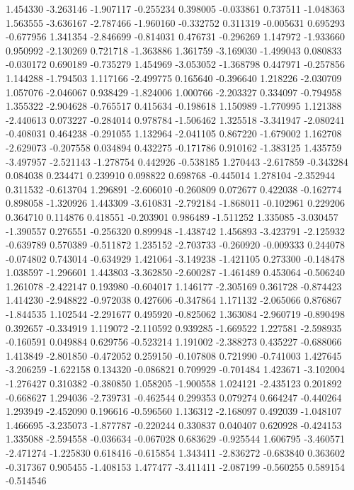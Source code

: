 1.454330
-3.263146
-1.907117
-0.255234
0.398005
-0.033861
0.737511
-1.048363
1.563555
-3.636167
-2.787466
-1.960160
-0.332752
0.311319
-0.005631
0.695293
-0.677956
1.341354
-2.846699
-0.814031
0.476731
-0.296269
1.147972
-1.933660
0.950992
-2.130269
0.721718
-1.363886
1.361759
-3.169030
-1.499043
0.080833
-0.030172
0.690189
-0.735279
1.454969
-3.053052
-1.368798
0.447971
-0.257856
1.144288
-1.794503
1.117166
-2.499775
0.165640
-0.396640
1.218226
-2.030709
1.057076
-2.046067
0.938429
-1.824006
1.000766
-2.203327
0.334097
-0.794958
1.355322
-2.904628
-0.765517
0.415634
-0.198618
1.150989
-1.770995
1.121388
-2.440613
0.073227
-0.284014
0.978784
-1.506462
1.325518
-3.341947
-2.080241
-0.408031
0.464238
-0.291055
1.132964
-2.041105
0.867220
-1.679002
1.162708
-2.629073
-0.207558
0.034894
0.432275
-0.171786
0.910162
-1.383125
1.435759
-3.497957
-2.521143
-1.278754
0.442926
-0.538185
1.270443
-2.617859
-0.343284
0.084038
0.234471
0.239910
0.098822
0.698768
-0.445014
1.278104
-2.352944
0.311532
-0.613704
1.296891
-2.606010
-0.260809
0.072677
0.422038
-0.162774
0.898058
-1.320926
1.443309
-3.610831
-2.792184
-1.868011
-0.102961
0.229206
0.364710
0.114876
0.418551
-0.203901
0.986489
-1.511252
1.335085
-3.030457
-1.390557
0.276551
-0.256320
0.899948
-1.438742
1.456893
-3.423791
-2.125932
-0.639789
0.570389
-0.511872
1.235152
-2.703733
-0.260920
-0.009333
0.244078
-0.074802
0.743014
-0.634929
1.421064
-3.149238
-1.421105
0.273300
-0.148478
1.038597
-1.296601
1.443803
-3.362850
-2.600287
-1.461489
0.453064
-0.506240
1.261078
-2.422147
0.193980
-0.604017
1.146177
-2.305169
0.361728
-0.874423
1.414230
-2.948822
-0.972038
0.427606
-0.347864
1.171132
-2.065066
0.876867
-1.844535
1.102544
-2.291677
0.495920
-0.825062
1.363084
-2.960719
-0.890498
0.392657
-0.334919
1.119072
-2.110592
0.939285
-1.669522
1.227581
-2.598935
-0.160591
0.049884
0.629756
-0.523214
1.191002
-2.388273
0.435227
-0.688066
1.413849
-2.801850
-0.472052
0.259150
-0.107808
0.721990
-0.741003
1.427645
-3.206259
-1.622158
0.134320
-0.086821
0.709929
-0.701484
1.423671
-3.102004
-1.276427
0.310382
-0.380850
1.058205
-1.900558
1.024121
-2.435123
0.201892
-0.668627
1.294036
-2.739731
-0.462544
0.299353
0.079274
0.664247
-0.440264
1.293949
-2.452090
0.196616
-0.596560
1.136312
-2.168097
0.492039
-1.048107
1.466695
-3.235073
-1.877787
-0.220244
0.330837
0.040407
0.620928
-0.424153
1.335088
-2.594558
-0.036634
-0.067028
0.683629
-0.925544
1.606795
-3.460571
-2.471274
-1.225830
0.618416
-0.615854
1.343411
-2.836272
-0.683840
0.363602
-0.317367
0.905455
-1.408153
1.477477
-3.411411
-2.087199
-0.560255
0.589154
-0.514546
